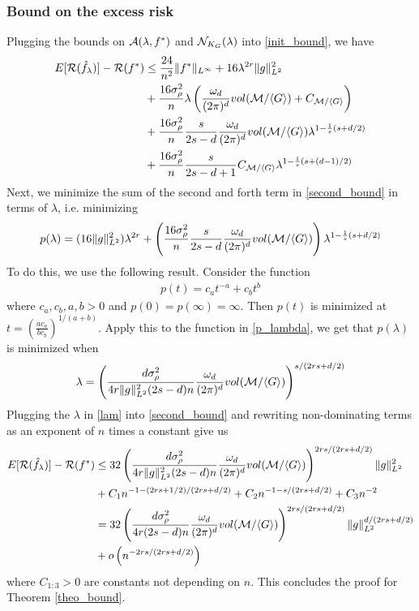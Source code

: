 \subsubsection{Bound on the excess risk}
Plugging the bounds on $\mathcal{A}(\lambda,f^*)$ and $\mathcal{N}_{K_G}(\lambda)$ into \eqref{init_bound}, we have
\begin{align}\label{second_bound}
\begin{alignedat}{3}
    E[\mathcal{R}(\hat{f}_\lambda)]-\mathcal{R}(f^*) & \le \frac{24}{n^2}\|f^*\|_{L^\infty}+16\lambda^{2r}\|g\|_{L^2}^2\\
    &+ \frac{16\sigma^2_\rho}{n}\lambda \left(\frac{\omega_d}{(2\pi)^d}vol(\mathcal{M}/\langle G\rangle) + C_{\mathcal{M}/\langle G\rangle}\right) \\
    &+ \frac{16\sigma^2_\rho}{n}\frac{s}{2s-d}\frac{\omega_d}{(2\pi)^d}vol(\mathcal{M}/\langle G\rangle)\lambda^{1-\frac{1}{s}(s+d/2)}\\
    &+\frac{16\sigma^2_\rho}{n}\frac{s}{2s-d+1}C_{\mathcal{M}/\langle G\rangle}\lambda^{1-\frac{1}{s}(s+(d-1)/2)}
\end{alignedat}
\end{align}
Next, we minimize the sum of the second and forth term in \eqref{second_bound} in terms of $\lambda$, i.e. minimizing 
\begin{align}\label{p_lambda}
    p(\lambda) = (16\|g\|_{L^2}^2)\lambda^{2r} + \left(\frac{16\sigma^2_\rho}{n}\frac{s}{2s-d}\frac{\omega_d}{(2\pi)^d}vol(\mathcal{M}/\langle G\rangle)\right)\lambda^{1-\frac{1}{s}(s+d/2)}
\end{align}
To do this, we use the following result. Consider the function
\begin{align}
    p(t) = c_at^{-a}+c_bt^{b}
\end{align}
where $c_a,c_b,a,b>0$ and $p(0)=p(\infty)=\infty$. Then $p(t)$ is minimized at $t= \left(\frac{ac_a}{bc_b}\right)^{1/(a+b)}$. Apply this to the function in \eqref{p_lambda}, we get that $p(\lambda)$ is minimized when
\begin{align}\label{lam}
    \lambda = \left(\frac{d\sigma^2_\rho}{4r\|g\|_{L^2}^2(2s-d)n}\frac{\omega_d}{(2\pi)^d}vol(\mathcal{M}/\langle G\rangle)\right)^{s/(2rs+d/2)}
\end{align}
Plugging the $\lambda$ in \eqref{lam} into \eqref{second_bound} and rewriting non-dominating terms as an exponent of $n$ times a constant give us
\begin{align}
    E[\mathcal{R}(\hat{f}_\lambda)]-\mathcal{R}(f^*) 
    & \le 32\left(\frac{d\sigma^2_\rho}{4r\|g\|_{L^2}^2(2s-d)n}\frac{\omega_d}{(2\pi)^d}vol(\mathcal{M}/\langle G\rangle)\right)^{2rs/(2rs+d/2)}\|g\|_{L^2}^2\\
    &+ C_1n^{-1-(2rs+1/2)/(2rs+d/2)} + C_2n^{-1-s/(2rs+d/2)} + C_3n^{-2}\\
    &= 32\left(\frac{d\sigma^2_\rho}{4r(2s-d)n}\frac{\omega_d}{(2\pi)^d}vol(\mathcal{M}/\langle G\rangle)\right)^{2rs/(2rs+d/2)}\|g\|_{L^2}^{d/(2rs+d/2)}\\
    &+ o\left(n^{-2rs/(2rs+d/2)}\right)
\end{align}
where $C_{1:3}>0$ are constants not depending on $n$. This concludes the proof for Theorem \ref{theo_bound}.

